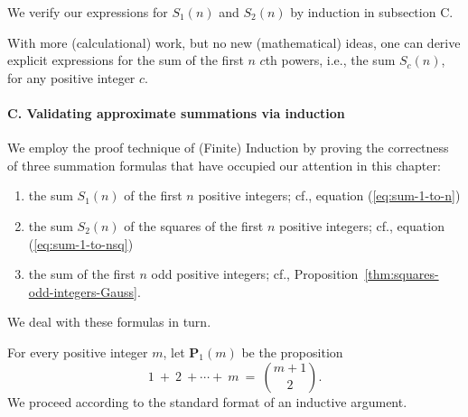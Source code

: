 \medskip

We verify our expressions for $S_1(n)$ and $S_2(n)$ by induction in
subsection C.

\medskip

With more (calculational) work, but no new (mathematical) ideas, one
can derive explicit expressions for the sum of the first $n$ $c$th
powers, i.e., the sum $S_c(n)$, for any positive integer $c$.


\medskip

\paragraph{\small\sf C. Validating approximate summations via induction}

We employ the proof technique of (Finite) Induction by proving the
correctness of three summation formulas that have occupied our
attention in this chapter:
\begin{enumerate}
\item
the sum $S_1(n)$ of the first $n$ positive integers; cf., equation
(\ref{eq:sum-1-to-n})

\item
the sum $S_2(n)$ of the squares of the first $n$ positive integers;
cf., equation (\ref{eq:sum-1-to-nsq})

\item
the sum of the first $n$ odd positive integers; cf.,
Proposition~\ref{thm:squares-odd-integers-Gauss}.
\end{enumerate}
We deal with these formulas in turn.

%
For every positive integer $m$, let {\bf P}$_1(m)$ be the proposition
\[  1 \ + \ 2 \ +  \cdots  + \ m \ = \ {{m+1} \choose 2}. \]
We proceed according to the standard format of an inductive argument.

